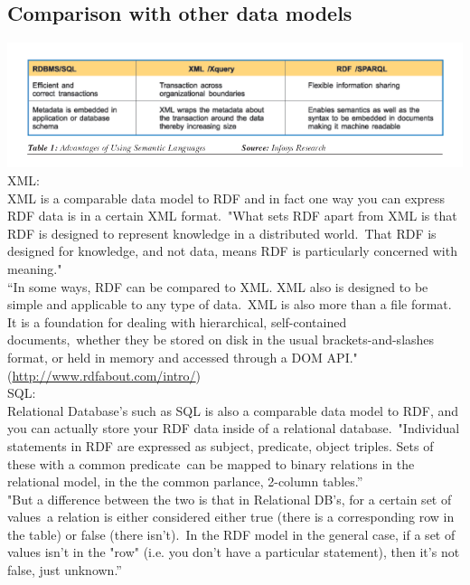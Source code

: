 \documentclass[DIV=calc, paper=a4, fontsize=12pt, onecolumn]{scrartcl}	 %
\begin{document}
\subsection{Comparison with other data models}

\includegraphics[scale=0.5]{sqlrdf.png}
 \cite{parachuri2008role}\\

XML:\\

XML is a comparable data model to RDF and in fact one way you can express RDF data is in a certain XML format.\
"What sets RDF apart from XML is that RDF is designed to represent knowledge in a distributed world.\
That RDF is designed for knowledge, and not data, means RDF is particularly concerned with meaning."\\

“In some ways, RDF can be compared to XML. XML also is designed to be simple and applicable to any type of data.\
XML is also more than a file format. It is a foundation for dealing with hierarchical, self-contained documents,\
 whether they be stored on disk in the usual brackets-and-slashes format, or held in memory and accessed through a DOM API."\\

 (\url{http://www.rdfabout.com/intro/})\\

SQL: \\

Relational Database’s such as SQL is also a comparable data model to RDF, and you can actually store your RDF data inside of a relational database.\
"Individual statements in RDF are expressed as subject, predicate, object triples. Sets of these with a common predicate\
 can be mapped to binary relations in the relational model, in the the common parlance, 2-column tables.”\\

"But a difference between the two is that in Relational DB's, for a certain set of values\
a relation is either considered either true (there is a corresponding row in the table) or false (there isn't).\
 In the RDF model in the general case, if a set of values isn't in the "row" (i.e. you don't have a particular statement), then it's not false, just unknown.”\\
\end{document}

